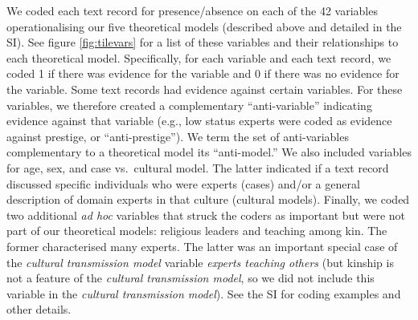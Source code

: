 \documentclass[
  11pt,
]{article}
\begin{document}
We coded each text record for presence/absence on each of the 42 variables operationalising our five theoretical models (described above and detailed in the SI). See figure \ref{fig:tilevars} for a list of these variables and their relationships to each theoretical model. Specifically, for each variable and each text record, we coded 1 if there was evidence for the variable and 0 if there was no evidence for the variable. Some text records had evidence against certain variables. For these variables, we therefore created a complementary ``anti-variable'' indicating evidence against that variable (e.g., low status experts were coded as evidence against prestige, or ``anti-prestige''). We term the set of anti-variables complementary to a theoretical model its ``anti-model.'' We also included variables for age, sex, and case vs.~cultural model. The latter indicated if a text record discussed specific individuals who were experts (cases) and/or a general description of domain experts in that culture (cultural models). Finally, we coded two additional \emph{ad hoc} variables that struck the coders as important but were not part of our theoretical models: religious leaders and teaching among kin. The former characterised many experts. The latter was an important special case of the \emph{cultural transmission model} variable \emph{experts teaching others} (but kinship is not a feature of the \emph{cultural transmission model}, so we did not include this variable in the \emph{cultural transmission model}). See the SI for coding examples and other details.
\end{document}

